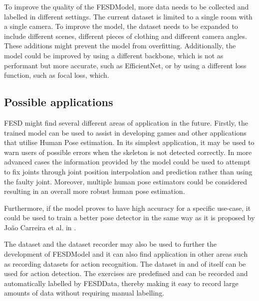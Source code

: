 To improve the quality of the FESDModel, more data needs to be collected and labelled in different settings. The current dataset is limited to a single room with a single camera. To improve the model, the dataset needs to be expanded to include different scenes, different pieces of clothing and different camera angles. These additions might prevent the model from overfitting. Additionally, the model could be improved by using a different backbone, which is not as performant but more accurate, such as EfficientNet, or by using a different loss function, such as focal loss, which.

\subsection{Possible applications}

FESD might find several different areas of application in the future. Firstly, the trained model can be used to assist in developing games and other applications that utilise Human Pose estimation. In its simplest application, it may be used to warn users of possible errors when the skeleton is not detected correctly. In more advanced cases the information provided by the model could be used to attempt to fix joints through joint position interpolation and prediction rather than using the faulty joint. Moreover, multiple human pose estimators could be considered resulting in an overall more robust human pose estimation.

Furthermore, if the model proves to have high accuracy for a specific use-case, it could be used to train a better pose detector in the same way as it is proposed by Jo\~ao Carreira et al. in \cite{IterativeErrorFeedback}.

The dataset and the dataset recorder may also be used to further the development of FESDModel and it can also find application in other areas such as recording datasets for action recognition. The dataset in and of itself can be used for action detection. The exercises are predefined and can be recorded and automatically labelled by FESDData, thereby making it easy to record large amounts of data without requiring manual labelling.